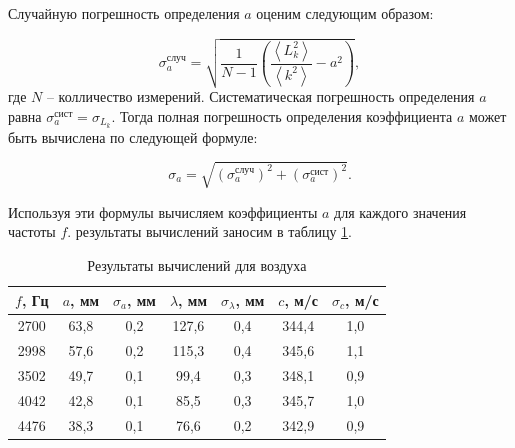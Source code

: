\documentclass[a4paper,12pt]{article} %
\begin{document}
\begin{center}
\end{center}

Случайную погрешность определения $ a $ оценим следующим образом:

\begin{equation}\label{mnk:sigma_a}
\sigma^\text{случ}_a=\sqrt{\frac{1}{N-1}\left(\frac{\left\langle L_k^2 \right\rangle}{\left\langle k^2 \right\rangle}-a^2\right)},
\end{equation}
где $ N $ -- колличество измерений. Систематическая погрешность определения $ a $ равна $ \sigma_a^\text{сист} = \sigma_{L_k} $. Тогда полная погрешность определения коэффициента $ a $ может быть вычислена по следующей формуле:

\begin{equation}\label{mnk:full_sigma}
\sigma_a=\sqrt{\left(\sigma^\text{случ}_a\right)^2+\left(\sigma^\text{сист}_a\right)^2}.
\end{equation}

Используя эти формулы вычисляем коэффициенты $ a $ для каждого значения частоты $ f $. результаты вычислений заносим в таблицу \ref{tab:resO2}.

\begin{table}[H]
	\centering
	\begin{tabular}{|c|c|c|c|c|c|c|}
		\hline
		$ f $, Гц & $ a $, мм & $ \sigma_a $, мм & $ \lambda $, мм & $ \sigma_\lambda $, мм & $ c $, м/с & $ \sigma_c $, м/с \\ \hline
		2700 & 63,8 & 0,2 & 127,6 & 0,4 & 344,4 & 1,0 \\ \hline
		2998 & 57,6 & 0,2 & 115,3 & 0,4 & 345,6 & 1,1 \\ \hline
		3502 & 49,7 & 0,1 & 99,4 & 0,3 & 348,1 & 0,9 \\ \hline
		4042 & 42,8 & 0,1 & 85,5 & 0,3 & 345,7 & 1,0 \\ \hline
		4476 & 38,3 & 0,1 & 76,6 & 0,2 & 342,9 & 0,9 \\ \hline
	\end{tabular}
	\caption{Результаты вычислений для воздуха}
	\label{tab:resO2}
\end{table}
\end{document}
